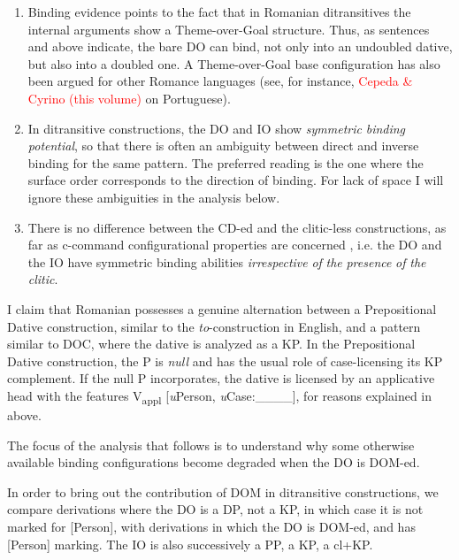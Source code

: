 \documentclass[output=paper,modfonts,nonflat,newtxmath]{langsci/langscibook}
\begin{document}
\begin{enumerate}
	\item Binding evidence points to the fact that in Romanian ditransitives the internal arguments show a Theme-over-Goal structure. Thus, as sentences  and  above indicate, the bare DO can bind, not only into an undoubled dative, but also into a doubled one. A Theme-over-Goal base configuration has also been argued for other Romance languages (see, for instance, \textcolor{red}{Cepeda \& Cyrino (this volume)} on Portuguese).
	
	\item In ditransitive constructions, the DO and IO show \textit{symmetric} \textit{binding} \textit{potential}, so that there is often an ambiguity between direct and inverse binding for the same pattern. The preferred reading is the one where the surface order corresponds to the direction of binding. For lack of space I will ignore these ambiguities in the analysis below.
	
	\item There is no difference between the CD-ed and the clitic-less constructions, as far as c-command configurational properties are concerned \citep{CornilescuDinuTigău2017DOC}, i.e. the DO and the IO have symmetric binding abilities \textit{irrespective} \textit{of} \textit{the} \textit{presence} \textit{of} \textit{the} \textit{clitic}.
\end{enumerate}


I claim that Romanian possesses a genuine alternation between a Prepositional Dative construction, similar to the \textit{to}{}-construction in English, and a pattern similar to DOC, where the dative is analyzed as a KP. In the Prepositional Dative construction, the P is \textit{null} and has the usual role of case-licensing its KP complement. If the null P incorporates, the dative is licensed by an applicative head with the features V\textsubscript{appl} [\textit{u}Person, \textit{u}Case:\_\_\_\_], for reasons explained in  above.

The focus of the analysis that follows is to understand why some otherwise available binding configurations become degraded when the DO is DOM-ed.

In order to bring out the contribution of DOM in ditransitive constructions, we compare derivations where the DO is a DP, not a KP, in which case it is not marked for [Person], with derivations in which the DO is DOM-ed, and has [Person] marking. The IO is also successively a PP, a KP, a cl+KP.
\end{document}
